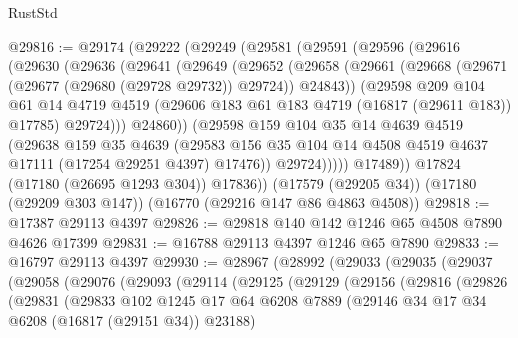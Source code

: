 \begin{lexlean}{RustStd}
\begin{coremodule}
@29816 := @29174
    (@29222
      (@29249
        (@29581
          (@29591
            (@29596
              (@29616
                (@29630
                  (@29636
                    (@29641
                      (@29649
                        (@29652
                          (@29658
                            (@29661
                              (@29668 (@29671 (@29677 (@29680 (@29728 @29732)) @29724)) @24843))
                            (@29598
                              @209
                              @104
                              @61
                              @14
                              @4719
                              @4519
                              (@29606 @183 @61 @183 @4719 (@16817 (@29611 @183)) @17785)
                              @29724)))
                        @24860))
                    (@29598
                      @159
                      @104
                      @35
                      @14
                      @4639
                      @4519
                      (@29638
                        @159
                        @35
                        @4639
                        (@29583
                          @156
                          @35
                          @104
                          @14
                          @4508
                          @4519
                          @4637
                          @17111
                          (@17254 @29251 @4397)
                          @17476))
                      @29724)))))
            @17489))
        @17824
        (@17180 (@26695 @1293 @304))
        @17836))
    (@17579 (@29205 @34))
    (@17180 (@29209 @303 @147))
    (@16770 (@29216 @147 @86 @4863 @4508))
@29818 := @17387 @29113 @4397
@29826 := @29818 @140 @142 @1246 @65 @4508 @7890 @4626 @17399
@29831 := @16788 @29113 @4397 @1246 @65 @7890
@29833 := @16797 @29113 @4397
@29930 := @28967
    (@28992
      (@29033
        (@29035
          (@29037
            (@29058
              (@29076
                (@29093
                  (@29114
                    (@29125
                      (@29129
                        (@29156
                          (@29816
                            (@29826
                              (@29831
                                (@29833
                                  @102
                                  @1245
                                  @17
                                  @64
                                  @6208
                                  @7889
                                  (@29146 @34 @17 @34 @6208 (@16817 (@29151 @34)) @23188)

\end{coremodule}
\end{lexlean}
